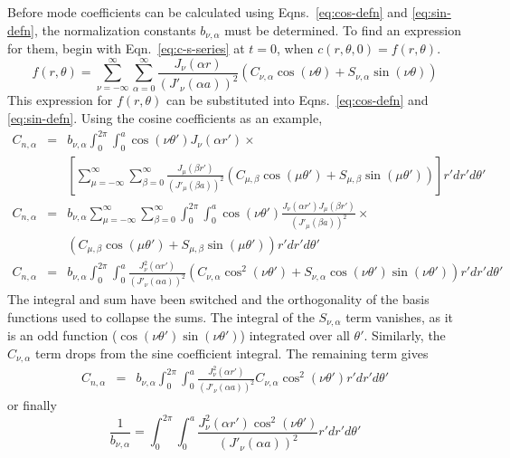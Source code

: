 Before mode coefficients can be calculated using Eqns.~\ref{eq:cos-defn} and \ref{eq:sin-defn}, the normalization constants $b_{\nu,\alpha}$ must be determined.  To find an expression for them, begin with Eqn.~\ref{eq:c-s-series} at $t=0$, when $c(r,\theta,0) = f(r,\theta)$.
\begin{equation}
f(r,\theta)= \sum_{\nu=-\infty}^{\infty} \sum_{\alpha = 0}^\infty   \frac{J_\nu\left(\alpha r\right)}{\left(J'_\nu (\alpha a)\right)^2} \left(C_{\nu,\alpha}\cos(\nu\theta) + S_{\nu,\alpha} \sin(\nu\theta)\right)
\label{eq:c-s-series-t-0}
\end{equation}
This expression for $f(r,\theta)$ can be substituted into Eqns.~\ref{eq:cos-defn} and \ref{eq:sin-defn}.  Using the cosine coefficients as an example,
\begin{eqnarray*}
C_{n,\alpha} & = &b_{\nu,\alpha} \int_0^{2\pi} \int_0^a \cos\left(\nu\theta'\right) J_\nu(\alpha r') \times\\
& &\left[\sum_{\mu=-\infty}^{\infty} \sum_{\beta = 0}^\infty   \frac{J_\mu\left(\beta r'\right)}{\left(J'_\mu (\beta a)\right)^2} \left(C_{\mu,\beta}\cos(\mu\theta') + S_{\mu,\beta} \sin(\mu\theta')\right)\right] r' dr' d\theta'\\
C_{n,\alpha} & = &b_{\nu,\alpha} \sum_{\mu=-\infty}^{\infty} \sum_{\beta = 0}^\infty\int_0^{2\pi} \int_0^a \cos\left(\nu\theta'\right)  \frac{ J_\nu(\alpha r')   J_\mu\left(\beta r'\right)}{\left(J'_\mu (\beta a)\right)^2} \times\\
& & \left(C_{\mu,\beta}\cos(\mu\theta') + S_{\mu,\beta} \sin(\mu\theta')\right) r' dr' d\theta'\\
C_{n,\alpha} & = &b_{\nu,\alpha} \int_0^{2\pi} \int_0^a  \frac{ J_\nu^2(\alpha r')}{\left(J'_\nu (\alpha a)\right)^2} \left(C_{\nu,\alpha}\cos^2(\nu\theta') + S_{\nu,\alpha}\cos\left(\nu\theta'\right)\sin(\nu\theta')\right) r' dr' d\theta'
\end{eqnarray*}
The integral and sum have been switched and the orthogonality of the basis functions used to collapse the sums.  The integral of the $S_{\nu,\alpha}$ term vanishes, as it is an odd function ($\cos\left(\nu\theta'\right)\sin(\nu\theta')$) integrated over all $\theta'$.  Similarly, the $C_{\nu,\alpha}$ term drops from the sine coefficient integral.  The remaining term gives
\begin{eqnarray*}
C_{n,\alpha} & = &b_{\nu,\alpha} \int_0^{2\pi} \int_0^a  \frac{ J_\nu^2(\alpha r')}{\left(J'_\nu (\alpha a)\right)^2} C_{\nu,\alpha}\cos^2(\nu\theta') r' dr' d\theta'
\end{eqnarray*} or finally
\begin{equation}
\frac{1}{b_{\nu,\alpha}}  =  \int_0^{2\pi} \int_0^a  \frac{ J_\nu^2(\alpha r')\cos^2(\nu\theta') }{\left(J'_\nu (\alpha a)\right)^2} r' dr' d\theta' \label{eq:bna-theory}
\end{equation}

